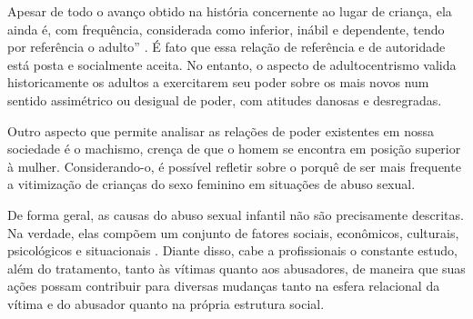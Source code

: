 Apesar de todo o avanço obtido na história concernente ao lugar de criança, ela ainda é, com frequência, considerada como inferior, inábil e dependente, tendo por referência o adulto'' \cite[p. 6]{JUNG2006}. É fato que essa relação de referência e de autoridade está posta e socialmente aceita. No entanto, o aspecto de adultocentrismo valida historicamente os adultos a exercitarem seu poder sobre os mais novos num sentido assimétrico ou desigual de poder, com atitudes danosas e desregradas. 

Outro aspecto que permite analisar as relações de poder existentes em nossa sociedade é o machismo, crença de que o homem se encontra em posição superior à mulher. Considerando-o, é possível refletir sobre o porquê de ser mais frequente a vitimização de crianças do sexo feminino em situações de abuso sexual.

De forma geral, as causas do abuso sexual infantil não são precisamente descritas. Na verdade, elas compõem um conjunto de fatores sociais, econômicos, culturais, psicológicos e situacionais \cite{JUNG2006}. Diante disso, cabe a profissionais o constante estudo, além do tratamento, tanto às vítimas quanto aos abusadores, de maneira que suas ações possam contribuir para diversas mudanças tanto na esfera relacional da vítima e do abusador quanto na própria estrutura social.